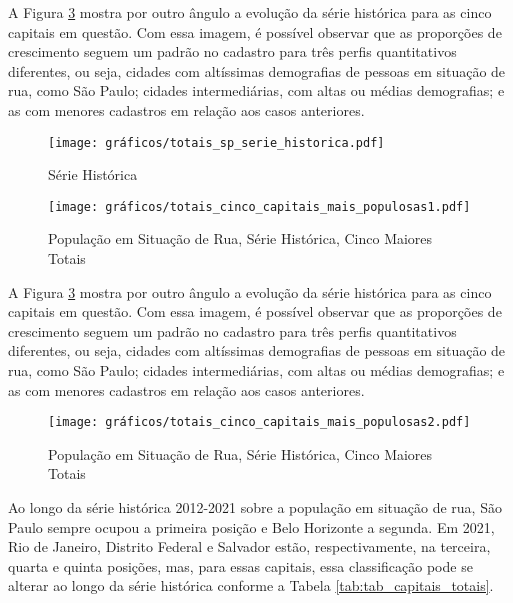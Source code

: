 \documentclass[14pt]{extarticle}
\begin{document}
A Figura \ref{fig:grafico_pop_rua_totais2} mostra por outro ângulo a evolução da série histórica para as cinco capitais em questão. Com essa imagem, é possível observar que as proporções de crescimento seguem um padrão  no cadastro para três perfis quantitativos diferentes, ou seja, cidades com altíssimas demografias de pessoas em situação de rua, como São Paulo; cidades intermediárias, com altas ou médias demografias; e as com menores cadastros em relação aos casos anteriores.\\

%
\begin{figure}[hb!]
\centering
	\caption{Série Histórica}
	\texttt{[image: gráficos/totais\_sp\_serie\_historica.pdf]}
	\label{fig:serie_historica_sp}
\end{figure}

\begin{figure}[hb!]
\centering
	\caption{População em Situação de Rua, Série Histórica, Cinco Maiores Totais}
	\texttt{[image: gráficos/totais\_cinco\_capitais\_mais\_populosas1.pdf]}
	\label{fig:grafico_pop_rua_totais1}
\end{figure}

A Figura \ref{fig:grafico_pop_rua_totais2} mostra por outro ângulo a evolução da série histórica para as cinco capitais em questão. Com essa imagem, é possível observar que as proporções de crescimento seguem um padrão  no cadastro para três perfis quantitativos diferentes, ou seja, cidades com altíssimas demografias de pessoas em situação de rua, como São Paulo; cidades intermediárias, com altas ou médias demografias; e as com menores cadastros em relação aos casos anteriores.\\

\begin{figure}[H]
\centering
	\caption{População em Situação de Rua, Série Histórica, Cinco Maiores Totais}
	\texttt{[image: gráficos/totais\_cinco\_capitais\_mais\_populosas2.pdf]}
	\label{fig:grafico_pop_rua_totais2}
\end{figure}

Ao longo da série histórica 2012-2021 sobre a população em situação de rua, São Paulo sempre ocupou a primeira posição e Belo Horizonte a segunda. Em 2021, Rio de Janeiro, Distrito Federal e Salvador estão, respectivamente, na terceira, quarta e quinta posições, mas, para essas capitais, essa classificação pode se alterar ao longo da série histórica conforme a Tabela \ref{tab:tab_capitais_totais}.\\
\end{document}
